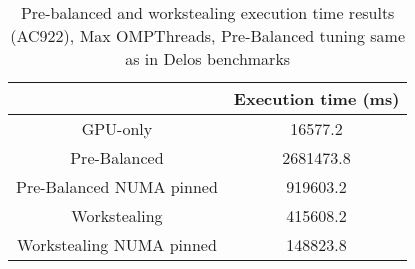 \begin{table}[H]
  \centering
  \begin{tabular}{||c | c||} 
   \hline
    & Execution time (ms) \\ [0.5ex] 
   \hline\hline
   GPU-only & 16577.2 \\
   Pre-Balanced & 2681473.8 \\ 
   Pre-Balanced NUMA pinned & 919603.2 \\
   Workstealing & 415608.2 \\
   Workstealing NUMA pinned & 148823.8 \\ [1ex] 
   \hline
  \end{tabular}
  \caption{Pre-balanced and workstealing execution time results (AC922), Max OMPThreads, Pre-Balanced tuning same as in Delos benchmarks}
  \label{table:bench_ac922}
\end{table}